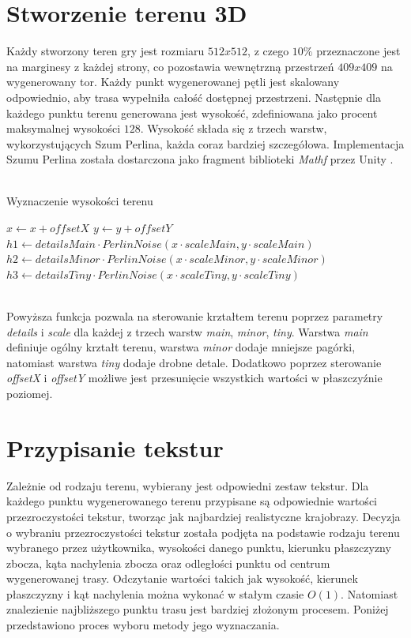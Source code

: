 \section{Stworzenie terenu 3D}
Każdy stworzony teren gry jest rozmiaru $512 x 512$, z czego $10\%$ przeznaczone jest na marginesy z każdej strony, co pozostawia wewnętrzną przestrzeń $409 x 409$ na wygenerowany tor. Każdy punkt wygenerowanej pętli jest skalowany odpowiednio, aby trasa wypełniła całość dostępnej przestrzeni. Następnie dla każdego punktu terenu generowana jest wysokość, zdefiniowana jako procent maksymalnej wysokości $128$. Wysokość składa się z trzech warstw, wykorzystujących Szum Perlina, każda coraz bardziej szczegółowa. Implementacja Szumu Perlina została dostarczona jako fragment biblioteki \textit{Mathf} przez Unity \cite{PerlinNoise}.
\\\\
\begin{algorithm}[H]
    \caption{Wyznaczenie wysokości terenu}\label{alg}
    $x \gets x + offsetX$\;
    $y \gets y + offsetY$\;
    $h1 \gets detailsMain \cdot PerlinNoise(x \cdot scaleMain, y \cdot scaleMain)$\;
    $h2 \gets detailsMinor \cdot PerlinNoise(x \cdot scaleMinor, y \cdot scaleMinor)$\;
    $h3 \gets detailsTiny \cdot PerlinNoise(x \cdot scaleTiny, y \cdot scaleTiny)$\;
\end{algorithm}
\phantom{.}\\
Powyższa funkcja pozwala na sterowanie krztałtem terenu poprzez parametry \textit{details} i \textit{scale} dla każdej z trzech warstw \textit{main}, \textit{minor}, \textit{tiny}. Warstwa \textit{main} definiuje ogólny krztałt terenu, warstwa \textit{minor} dodaje mniejsze pagórki, natomiast warstwa \textit{tiny} dodaje drobne detale. Dodatkowo poprzez sterowanie \textit{offsetX} i \textit{offsetY} możliwe jest przesunięcie wszystkich wartości w płaszczyźnie poziomej.

\section{Przypisanie tekstur}
Zależnie od rodzaju terenu, wybierany jest odpowiedni zestaw tekstur. Dla każdego punktu wygenerowanego terenu przypisane są odpowiednie wartości przezroczystości tekstur, tworząc jak najbardziej realistyczne krajobrazy. Decyzja o wybraniu przezroczystości tekstur została podjęta na podstawie rodzaju terenu wybranego przez użytkownika, wysokości danego punktu, kierunku płaszczyzny zbocza, kąta nachylenia zbocza oraz odległości punktu od centrum wygenerowanej trasy. Odczytanie wartości takich jak wysokość, kierunek płaszczyzny i kąt nachylenia można wykonać w stałym czasie $O(1)$. Natomiast znalezienie najbliższego punktu trasu jest bardziej złożonym procesem. Poniżej przedstawiono proces wyboru metody jego wyznaczania.

